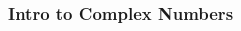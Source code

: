 \documentclass[11pt]{book}
\newcommand{\tmstrong}[1]{\textbf{#1}}
\theoremstyle{definition}  %
\newcommand{\pp}{\par~\par}
\begin{document}
\begin{multicols}{2}
\end{multicols}


\subsubsection{Intro to Complex Numbers}

\end{document}
